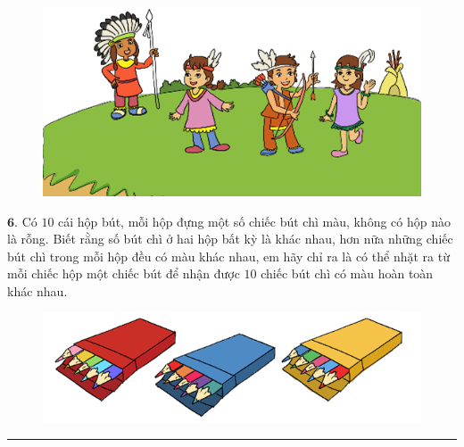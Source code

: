 \begin{multicols}{2}
\begin{figure}[H]
		\centering
		\captionsetup{labelformat= empty, justification=centering}
		\includegraphics[width= 1\linewidth]{b5}
		\vspace*{-15pt}
	\end{figure}
	$\pmb{6.}$ Có $10$ cái hộp bút, mỗi hộp đựng một số chiếc bút chì màu, không có hộp nào là rỗng. Biết rằng số bút chì ở hai hộp bất kỳ là khác nhau, hơn nữa những chiếc bút chì trong mỗi hộp đều có màu khác nhau, em hãy chỉ ra là có thể nhặt ra từ mỗi chiếc hộp một chiếc bút để nhận được $10$ chiếc bút chì có màu hoàn toàn khác nhau. 
	\begin{figure}[H]
		\vspace*{-5pt}
		\centering
		\captionsetup{labelformat= empty, justification=centering}
		\includegraphics[width= 1\linewidth]{b6}
		\vspace*{-5pt}
	\end{figure}
\end{multicols}
\vspace*{-10pt}
\rule{1\linewidth}{0.1pt}
\begingroup
